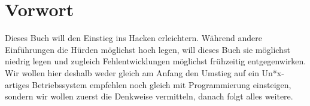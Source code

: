 
\chapter{Vorwort}

Dieses Buch will den Einstieg ins Hacken erleichtern. Während andere Einführungen die Hürden möglichst hoch legen, will dieses Buch sie möglichst niedrig legen und zugleich Fehlentwicklungen möglichst frühzeitig entgegenwirken. Wir wollen hier deshalb weder gleich am Anfang den Umstieg auf ein Un*x-artiges Betriebssystem empfehlen noch gleich mit Programmierung einsteigen, sondern wir wollen zuerst die Denkweise vermitteln, danach folgt alles weitere.

